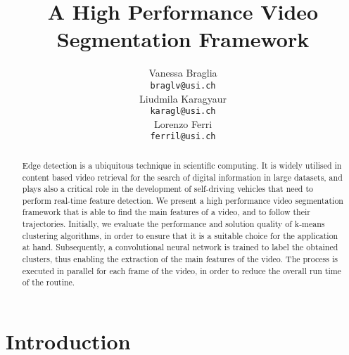 \documentclass{article}
\title{A High Performance Video Segmentation Framework }
\author{
  Vanessa Braglia \\
  \texttt{braglv@usi.ch} \\
   \And
 Liudmila Karagyaur \\
  \texttt{karagl@usi.ch} \\
     \And
  Lorenzo Ferri \\
  \texttt{ferril@usi.ch} \\
}
\begin{document}
{\selectfont
\maketitle

\begin{abstract}
Edge detection is a ubiquitous technique in scientific computing. It is widely utilised in content based video retrieval for the search of digital information in large datasets, and plays also a critical role in the development of self-driving vehicles that need to perform real-time feature detection.
We present a high performance video segmentation framework that is able to find the main features of a video, and to follow their trajectories. Initially, we evaluate the performance and solution quality of k-means clustering algorithms, in order to ensure that it is a suitable choice for the application at hand. Subsequently, a convolutional neural network is trained to label the obtained clusters, thus enabling the extraction of the main features of the video. The process is executed in parallel for each frame of the video, in order to reduce the overall run time of the routine.
\end{abstract}



\large
\section{Introduction}

}
\end{document}
